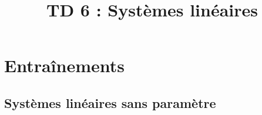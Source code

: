 \documentclass[a4paper, 11pt,reqno]{article}
\newcommand{\type}{TD }
\begin{document}
\title{\type 6 : Systèmes linéaires}




\vspace{0.2cm}



\section*{Entraînements}
\noindent \subsection*{Syst\`{e}mes lin\'eaires sans param\`{e}tre}
\vspace{0.2cm}


\end{document}
